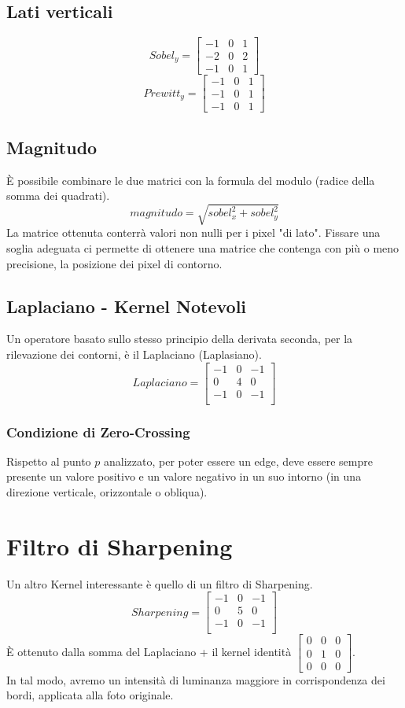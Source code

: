 \documentclass{report}
\begin{document}
	\subsection{Lati verticali}
	$$
	Sobel_y = 
	\begin{bmatrix}
		-1 & 0 & 1 \\
		-2 & 0 & 2 \\
		-1 & 0 & 1 
	\end{bmatrix}
	$$
	$$
	Prewitt_y = 
	\begin{bmatrix}
		-1 & 0 & 1 \\
		-1 & 0 & 1 \\
		-1 & 0 & 1 
	\end{bmatrix}
	$$
	\subsection{Magnitudo}
	È possibile combinare le due matrici con la formula del modulo (radice della somma dei quadrati).
	$$
	magnitudo = \sqrt{sobel_x^2 + sobel_y^2}
	$$
	La matrice ottenuta conterrà valori non nulli per i pixel "di lato". Fissare una soglia adeguata ci permette di ottenere una matrice che contenga con più o meno precisione, la posizione dei pixel di contorno.
	\subsection{Laplaciano - Kernel Notevoli}
	Un operatore basato sullo stesso principio della derivata seconda, per la rilevazione dei contorni, è il Laplaciano (Laplasiano).
	$$
	Laplaciano = \begin{bmatrix}
	-1 & 0 & -1\\
	0 & 4 & 0\\
	-1 & 0 & -1\\
	\end{bmatrix}
	$$
	\subsubsection{Condizione di Zero-Crossing}
	Rispetto al punto $p$ analizzato, per poter essere un edge, deve essere sempre presente un valore positivo e un valore negativo in un suo intorno (in una direzione verticale, orizzontale o obliqua).
		
	\section{Filtro di Sharpening}
	Un altro Kernel interessante è quello di un filtro di Sharpening.
	$$
	Sharpening = \begin{bmatrix}
	-1 & 0 & -1\\
	0 & 5 & 0\\
	-1 & 0 & -1\\
	\end{bmatrix}
	$$
	È ottenuto dalla somma del Laplaciano + il kernel identità $\begin{bmatrix}
	0 & 0 & 0\\
	0 & 1 & 0\\
	0 & 0 & 0
	\end{bmatrix}$.\\
	In tal modo, avremo un intensità di luminanza maggiore in corrispondenza dei bordi, applicata alla foto originale. 
		
\end{document}
